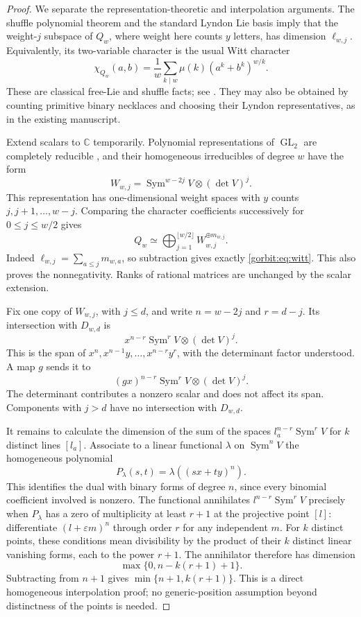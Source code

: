 \begin{proof}
We separate the representation-theoretic and interpolation arguments.
The shuffle polynomial theorem and the standard Lyndon Lie basis imply
that the weight-$j$ subspace of $Q_w$, where weight here counts $y$
letters, has dimension $\ell_{w,j}$. Equivalently, its two-variable
character is the usual Witt character
\[
 \chi_{Q_w}(a,b)=\frac1w\sum_{k\mid w}\mu(k)(a^k+b^k)^{w/k}.
\]
These are classical free-Lie and shuffle facts; see
\cite{gorbit:Reutenauer}. They may also be obtained by
counting primitive binary necklaces and choosing their Lyndon
representatives, as in the existing manuscript.

Extend scalars to $\mathbb C$ temporarily. Polynomial representations
of $\operatorname{GL}_2$ are completely reducible
\cite{gorbit:Etingof}, and their homogeneous
irreducibles of degree $w$ have the form
\[
 W_{w,j}=\operatorname{Sym}^{w-2j}V\otimes(\det V)^j.
\]
This representation has one-dimensional weight spaces with $y$ counts
$j,j+1,\ldots,w-j$. Comparing the character coefficients successively
for $0\le j\le w/2$ gives
\begin{equation}\label{gorbit:eq:decomposition}
 Q_w\simeq\bigoplus_{j=1}^{\lfloor w/2\rfloor}
        W_{w,j}^{\oplus m_{w,j}}.
\end{equation}
Indeed $\ell_{w,j}=\sum_{a\le j}m_{w,a}$, so subtraction gives
exactly \eqref{gorbit:eq:witt}. This also proves the nonnegativity.
Ranks of rational matrices are unchanged by the scalar extension.

Fix one copy of $W_{w,j}$, with $j\le d$, and write
$n=w-2j$ and $r=d-j$. Its intersection with $D_{w,d}$ is
\[
 x^{n-r}\operatorname{Sym}^{r}V\otimes(\det V)^j.
\]
This is the span of $x^n,x^{n-1}y,\ldots,x^{n-r}y^r$, with the
determinant factor understood. A map $g$ sends it to
\[
 (gx)^{n-r}\operatorname{Sym}^{r}V\otimes(\det V)^j.
\]
The determinant contributes a nonzero scalar and does not affect its
span. Components with $j>d$ have no intersection with $D_{w,d}$.

It remains to calculate the dimension of the sum of the spaces
$l_a^{n-r}\operatorname{Sym}^rV$ for $k$ distinct lines $[l_a]$.
Associate to a linear functional $\lambda$ on $\operatorname{Sym}^nV$
the homogeneous polynomial
\[
 P_\lambda(s,t)=\lambda((sx+ty)^n).
\]
This identifies the dual with binary forms of degree $n$, since every
binomial coefficient involved is nonzero. The functional annihilates
$l^{n-r}\operatorname{Sym}^rV$ precisely when $P_\lambda$ has a zero
of multiplicity at least $r+1$ at the projective point $[l]$:
differentiate $(l+\varepsilon m)^n$ through order $r$ for any
independent $m$. For $k$ distinct points, these conditions mean
divisibility by the product of their $k$ distinct linear vanishing
forms, each to the power $r+1$. The annihilator therefore has dimension
\[
 \max\{0,n-k(r+1)+1\}.
\]
Subtracting from $n+1$ gives $\min\{n+1,k(r+1)\}$.
This is a direct homogeneous interpolation proof; no generic-position
assumption beyond distinctness of the points is needed.


\end{proof}

